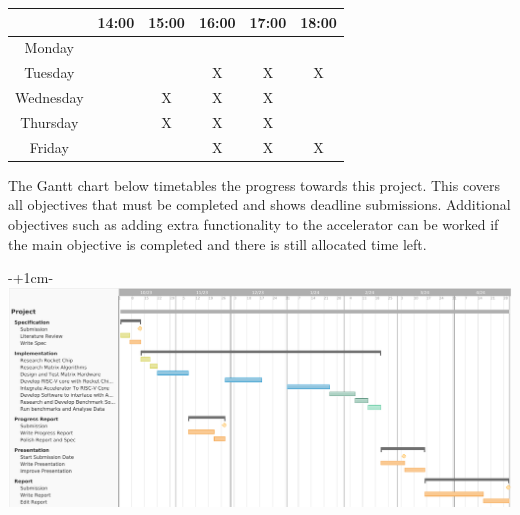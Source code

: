 \begin{table}[h]
	\centering
	\begin{tabular}{c|c|c|c|c|c|}
		\cline{2-6}
		& 14:00 & 15:00 & 16:00 & 17:00 & 18:00 \\ \hline
		\multicolumn{1}{|c|}{Monday}    &       &       &       &       &       \\ \hline
		\multicolumn{1}{|c|}{Tuesday}   &       &       & X     & X     & X     \\ \hline
		\multicolumn{1}{|c|}{Wednesday} &       & X     & X     & X     &       \\ \hline
		\multicolumn{1}{|c|}{Thursday}  &       & X     & X     & X     &       \\ \hline
		\multicolumn{1}{|c|}{Friday}    &       &       & X     & X     & X     \\ \hline
	\end{tabular}
\end{table}

The Gantt chart below timetables the progress towards this project. This covers all objectives that must be completed and shows deadline submissions. Additional objectives such as adding extra functionality to the accelerator can be worked if the main objective is completed and there is still allocated time left.

\begin{adjustwidth}{-\oddsidemargin-1in+1cm}{-\rightmargin}
	\centering
	\includegraphics[width=\paperwidth-2cm, frame]{./timeline.png}
\end{adjustwidth}

